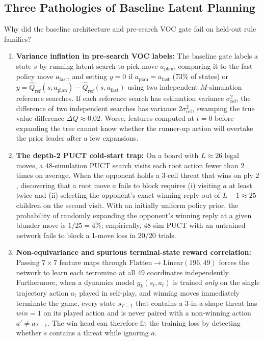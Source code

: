 \documentclass[preprint,3p,times]{elsarticle}
\begin{document}
\subsection{Three Pathologies of Baseline Latent Planning}
Why did the baseline architecture and pre-search VOC gate fail on held-out rule families?
\begin{enumerate}
    \item \textbf{Variance inflation in pre-search VOC labels:} The baseline gate labels a state $s$ by running latent search to pick move $a_{\text{plan}}$, comparing it to the fast policy move $a_{\text{fast}}$, and setting $y = 0$ if $a_{\text{plan}} = a_{\text{fast}}$ ($73\%$ of states) or $y = \hat{Q}_{\text{ref}}(s, a_{\text{plan}}) - \hat{Q}_{\text{ref}}(s, a_{\text{fast}})$ using two independent $M$-simulation reference searches. If each reference search has estimation variance $\sigma_{\text{ref}}^2$, the difference of two independent searches has variance $2\sigma_{\text{ref}}^2$, swamping the true value difference $\Delta Q \approx 0.02$. Worse, features computed at $t=0$ before expanding the tree cannot know whether the runner-up action will overtake the prior leader after a few expansions.
    \item \textbf{The depth-2 PUCT cold-start trap:} On a board with $L \approx 26$ legal moves, a $48$-simulation PUCT search visits each root action fewer than $2$ times on average. When the opponent holds a 3-cell threat that wins on ply $2$, discovering that a root move $a$ fails to block requires (i) visiting $a$ at least twice and (ii) selecting the opponent's exact winning reply out of $L-1 \approx 25$ children on the second visit. With an initially uniform policy prior, the probability of randomly expanding the opponent's winning reply at a given blunder move is $1/25 = 4\%$; empirically, $48$-sim PUCT with an untrained network fails to block a 1-move loss in $20/20$ trials.
    \item \textbf{Non-equivariance and spurious terminal-state reward correlation:} Passing $7 \times 7$ feature maps through $\mathrm{Flatten} \to \mathrm{Linear}(196, 49)$ forces the network to learn each tetromino at all $49$ coordinates independently. Furthermore, when a dynamics model $g_k(s_t, a_t)$ is trained \emph{only} on the single trajectory action $a_t$ played in self-play, and winning moves immediately terminate the game, every state $s_{T-1}$ that contains a 3-in-a-shape threat has $win = 1$ on its played action and is never paired with a non-winning action $a' \ne a_{T-1}$. The win head can therefore fit the training loss by detecting whether $s$ contains a threat while ignoring $a$.
\end{enumerate}
\end{document}
